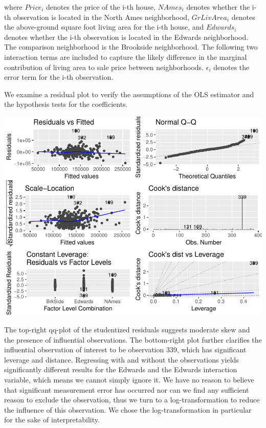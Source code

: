 \documentclass[american,]{article}
\begin{document}
where \(Price_i\) denotes the price of the i-th house, \(NAmes_i\)
denotes whether the i-th observation is located in the North Ames
neighborhood, \(GrLivArea_i\) denotes the above-ground square foot
living area for the i-th house, and \(Edwards_i\) denotes whether the
i-th observation is located in the Edwards neighborhood. The comparison
neighborhood is the Brookside neighborhood. The following two
interaction terms are included to capture the likely difference in the
marginal contribution of living area to sale price between
neighborhoods. \(\epsilon_i\) denotes the error term for the i-th
observation.

We examine a residual plot to verify the assumptions of the OLS
estimator and the hypothesis tests for the coefficients.

\includegraphics{HousePricesPaper_files/figure-latex/residualplot-1.pdf}

The top-right qq-plot of the studentized residuals suggests moderate
skew and the presence of influential observations. The bottom-right plot
further clarifies the influential observation of interest to be
observation 339, which has significant leverage and distance. Regressing
with and without the observations yields significantly different results
for the Edwards and the Edwards interaction variable, which means we
cannot simply ignore it. We have no reason to believe that significant
measurement error has occurred nor can we find any sufficient reason to
exclude the observation, thus we turn to a log-transformation to reduce
the influence of this observation. We chose the log-transformation in
particular for the sake of interpretability.
\end{document}
